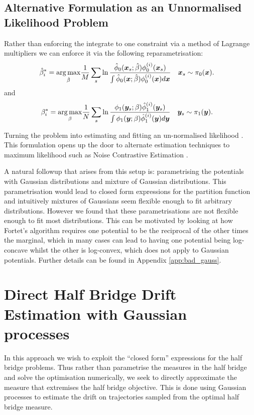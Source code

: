 \documentclass[a4paper,12pt,twoside,openright]{report}
\theoremstyle{definition}
\begin{document}
\subsection{Alternative Formulation as an Unnormalised Likelihood Problem}\label{sec:unormfit}

Rather than enforcing the integrate to one constraint via a method of Lagrange multipliers we can enforce it via the following reparametrisation:
\begin{align}
    \hat{\beta}^*_i = \operatorname*{arg\,max}_{\hat{\beta} } &\frac{1}{M} \sum_s \operatorname{ln} \frac{{\hat{\phi}}_0({\bm{x}}_s; \hat{\beta} )   \phi_0^{(i)}({\bm{x}}_s)}{ \int {\hat{\phi}}_0({\bm{x}}; \hat{\beta} )   \phi_0^{(i)}({\bm{x}}) d{\bm{x}}}
    \quad {\bm{x}}_s\sim \pi_0({\bm{x}}). \nonumber 
\end{align}
and
\begin{align}
    {\beta}^*_i = \operatorname*{arg\,max}_{{\beta} } &\frac{1}{N} \sum_s \operatorname{ln}\frac{ \phi_1({\bm{y}}_s; {\beta} )   {\hat{\phi}}_1^{(i)}({\bm{y}}_s)}{ \int \phi_1({\bm{y}}; {\beta} )   {\hat{\phi}}_1^{(i)}({\bm{y}}) d{\bm{y}} }
    \quad {\bm{y}}_s\sim \pi_1({\bm{y}}) .\nonumber 
\end{align}

Turning the problem into estimating and fitting an un-normalised likelihood \citep{gutmann2010noise}. This formulation opens up the door to alternate estimation techniques to maximum likelihood such as Noise Contrastive Estimation \cite{gutmann2010noise}.


A natural followup that arises from this setup is: parametrising the potentials with Gaussian distributions and mixture of Gaussian distributions. This parametrisation would lead to closed form expressions for the partition function and intuitively mixtures of Gaussians seem flexible enough to fit arbitrary distributions. However we found that these parametrisations are not flexible enough to fit most distributions. This can be motivated by looking at how Fortet's algorithm requires one potential to be the reciprocal of the other times the marginal, which in many cases can lead to having one potential being log-concave whilst the other is log-convex, which does not apply to Gaussian potentials. Further details can be found in Appendix \ref{app:bad_gauss}.


\section{Direct Half Bridge Drift Estimation with Gaussian processes}

In this approach we wish to exploit the ``closed form'' expressions for  the half bridge problems.  Thus rather than parametrise the measures in the half bridge and solve the optimisation numerically, we seek to directly approximate the measure that extremises the half bridge objective. This is done using Gaussian processes to estimate the drift on trajectories sampled from the optimal half bridge measure.
\end{document}
